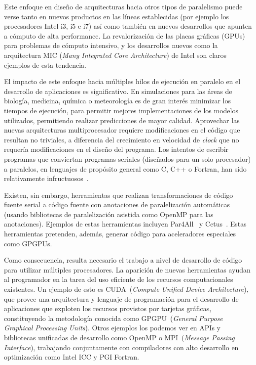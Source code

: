 Este enfoque en dise\~no de arquitecturas hacia otros tipos de paralelismo puede verse tanto en nuevos productos en las l\'ineas establecidas (por ejemplo los procesadores Intel i3, i5 e i7) as\'i como tambi\'en en nuevos desarrollos que apunten a c\'omputo de alta performance.
La revalorizaci\'on de las placas gr\'aficas (GPUs) para problemas de c\'omputo intensivo, y los desarrollos nuevos como la arquitectura MIC (\textit{Many Integrated Core Architecture}) de Intel son claros ejemplos de esta tendencia.

El impacto de este enfoque hacia m\'ultiples hilos de ejecuci\'on en paralelo en el desarrollo de aplicaciones es significativo.
En simulaciones para las \'areas de biolog\'ia, medicina, qu\'imica o meteorolog\'ia es de gran inter\'es minimizar los tiempos de ejecuci\'on, para permitir mejores implementaciones de los modelos utilizados, permitiendo realizar predicciones de mayor calidad.
Aprovechar las nuevas arquitecturas multiprocesador requiere modificaciones en el c\'odigo que resultan no triviales, a diferencia del crecimiento en velocidad de \textit{clock} que no requer\'ia modificaciones en el dise\~no del programa.
Los intentos de escribir programas que conviertan programas seriales (dise\~nados para un solo procesador) a paralelos, en lenguajes de prop\'osito general como C, C++ o Fortran, han sido relativamente infructuosos~\cite{Pacheco2011}.

Existen, sin embargo, herramientas que realizan transformaciones de c\'odigo fuente serial a c\'odigo fuente con anotaciones de paralelizaci\'on autom\'aticas (usando bibliotecas de paralelizaci\'on asistida como OpenMP para las anotaciones).
Ejemplos de estas herramientas incluyen Par4All~\cite{Par4AllThesis} y Cetus~\cite{CetusPaper}.
Estas herramientas pretenden, adem\'as, generar c\'odigo para aceleradores especiales como GPGPUs.

Como consecuencia, resulta necesario el trabajo a nivel de desarrollo de c\'odigo para utilizar m\'ultiples procesadores.
La aparici\'on de nuevas herramientas ayudan al programador en la tarea del uso eficiente de los recursos computacionales existentes.
Un ejemplo de esto es \nvidia CUDA~(\textit{Compute Unified Device Architecture}), que provee una arquitectura y lenguaje de programaci\'on para el desarrollo de aplicaciones que exploten los recursos provistos por tarjetas gr\'aficas, constituyendo la metodolog\'ia conocida como GPGPU~(\textit{General Purpose Graphical Processing Units}).
Otros ejemplos los podemos ver en APIs y bibliotecas unificadas de desarrollo como OpenMP o MPI~(\textit{Message Passing Interface}), trabajando conjuntamente con compiladores
con alto desarrollo en optimizaci\'on como Intel ICC y PGI Fortran.


